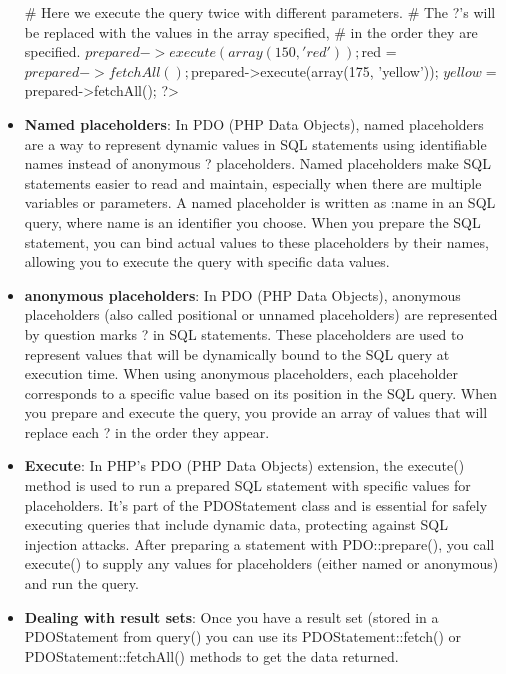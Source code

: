 \documentclass{report}
\begin{document}
\begin{itemize}
\begin{bashcode}
                    # Here we execute the query twice with different parameters.
                    # The ?'s will be replaced with the values in the array specified,
                    # in the order they are specified.
                    $prepared->execute(array(150, 'red'));
                    $red = $prepared->fetchAll();
                    $prepared->execute(array(175, 'yellow'));
                    $yellow = $prepared->fetchAll();
                ?>
            \end{bashcode}
        \item \textbf{Named placeholders}: In PDO (PHP Data Objects), named placeholders are a way to represent dynamic values in SQL statements using identifiable names instead of anonymous ? placeholders. Named placeholders make SQL statements easier to read and maintain, especially when there are multiple variables or parameters.
            \bigbreak \noindent 
            A named placeholder is written as :name in an SQL query, where name is an identifier you choose. When you prepare the SQL statement, you can bind actual values to these placeholders by their names, allowing you to execute the query with specific data values.
        \item \textbf{anonymous placeholders}: In PDO (PHP Data Objects), anonymous placeholders (also called positional or unnamed placeholders) are represented by question marks ? in SQL statements. These placeholders are used to represent values that will be dynamically bound to the SQL query at execution time.
            \bigbreak \noindent 
            When using anonymous placeholders, each placeholder corresponds to a specific value based on its position in the SQL query. When you prepare and execute the query, you provide an array of values that will replace each ? in the order they appear.
        \item \textbf{Execute}: In PHP's PDO (PHP Data Objects) extension, the execute() method is used to run a prepared SQL statement with specific values for placeholders. It’s part of the PDOStatement class and is essential for safely executing queries that include dynamic data, protecting against SQL injection attacks.
            \bigbreak \noindent 
            After preparing a statement with PDO::prepare(), you call execute() to supply any values for placeholders (either named or anonymous) and run the query.
        \item \textbf{Dealing with result sets}: Once you have a result set (stored in a PDOStatement from query() you can use its PDOStatement::fetch() or PDOStatement::fetchAll() methods to get the data returned.

\end{itemize}
\end{document}
